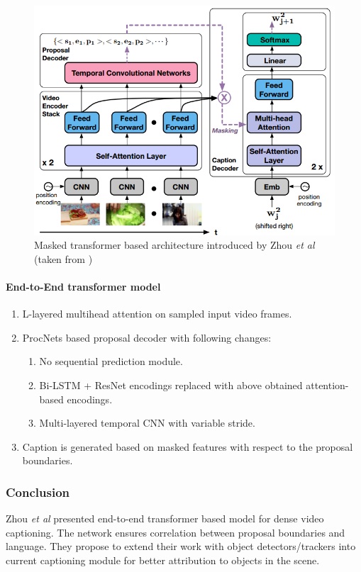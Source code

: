 \begin{figure}[h]
	\includegraphics[width=\linewidth]{assets/img/zhou2018end-architecture.png}
	\caption{Masked transformer based architecture introduced by Zhou \textit{et al} (taken from \cite{zhou2018end})}
\end{figure}

\paragraph{End-to-End transformer model}
\begin{enumerate}
	\item L-layered multihead attention on sampled input video frames.
	\item ProcNets\cite{zhou2017automatic} based proposal decoder with following changes:
	\begin{enumerate}
		\item No sequential prediction module.
		\item Bi-LSTM + ResNet encodings replaced with above obtained attention-based encodings.
		\item Multi-layered temporal CNN with variable stride. 
	\end{enumerate}
	\item Caption is generated based on masked features with respect to the proposal boundaries.
\end{enumerate}


\subsubsection{Conclusion}

\par Zhou \textit{et al} presented end-to-end transformer based model for dense video captioning. The network ensures correlation between proposal boundaries and language. They propose to extend their work with object detectors/trackers into current captioning module for better attribution to objects in the scene.